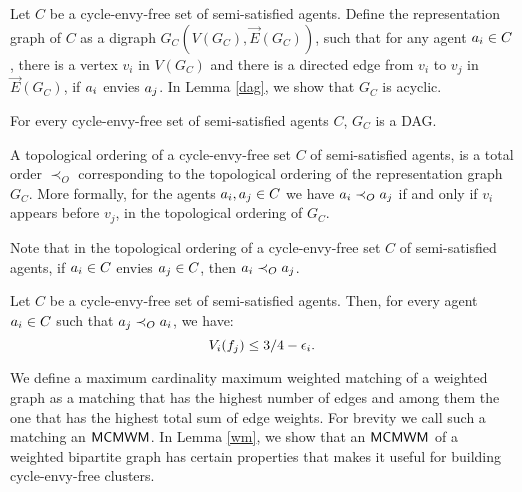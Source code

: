 Let $C$ be a cycle-envy-free set of semi-satisfied agents. Define the representation graph of $C$ as a digraph $G_C(V(G_C),\overrightarrow{E}(G_C))$, such that for any agent $a_i \in C$, there is a vertex $v_i$ in $V(G_C)$ and there is a directed edge from $v_i$ to $v_j$ in $\overrightarrow{E}(G_C)$, if $a_i$ envies $a_j$. In Lemma \ref{dag}, we show that $G_C$ is acyclic.
\begin{lemma}
\label{dag}
For every cycle-envy-free set of semi-satisfied agents $C$, $G_C$ is a DAG. 
\end{lemma}
\begin{definition}
 A topological ordering of a cycle-envy-free set $C$ of semi-satisfied agents, is a total order $\prec_O$ corresponding to the topological ordering of the representation graph $G_C$. More formally, for the agents $a_i,a_j \in C$ we have $a_i \prec_O a_j$ if and only if $v_i$ appears before $v_j$, in the topological ordering of $G_C$.  
\end{definition}

Note that in the topological ordering of a cycle-envy-free set $C$ of semi-satisfied agents, if $a_i \in C$ envies $a_j \in C$, then $a_i \prec_O a_j$. 


\begin{observation}
\label{epsofcluster}
Let $C$ be a cycle-envy-free set of semi-satisfied agents. Then, for every agent $a_i \in C$ such that $a_j \prec_O a_i$, we have:
$$V_i(f_j) \leq 3/4 - \epsilon_i.$$ 

\end{observation}

We define a maximum cardinality maximum weighted matching of a weighted graph as a matching that has the highest number of edges and among them the one that has the highest total sum of edge weights. For brevity we call such a matching an $\textsf{MCMWM}$. In Lemma \ref{wm}, we show that an $\textsf{MCMWM}$ of a weighted bipartite graph has certain properties that makes it useful for building cycle-envy-free clusters. 

